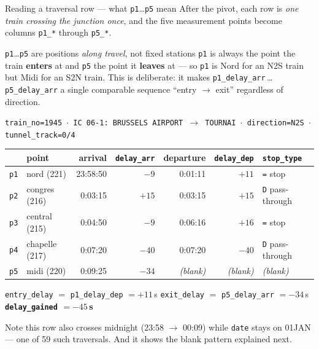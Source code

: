 \documentclass[aspectratio=169,10pt]{beamer}
\newcommand{\srcnote}[1]{{\scriptsize\color{ink3}#1}}
\newcommand{\hl}[1]{{\color{corange}\textbf{#1}}}
\begin{document}
\begin{frame}{Reading a traversal row --- what \texttt{p1}\dots\texttt{p5} mean}
  After the pivot, each row is \emph{one train crossing the junction once}, and the five
  measurement points become columns \texttt{p1\_*} through \texttt{p5\_*}.

  \vspace{0.4em}
  \begin{alertblock}{\small \texttt{p1}\dots\texttt{p5} are positions \emph{along travel}, not fixed stations}
    \small \texttt{p1} is always the point the train \textbf{enters} at and \texttt{p5} the
    point it \textbf{leaves} at --- so \texttt{p1} is Nord for an N2S train but Midi for an
    S2N train. This is deliberate: it makes
    \texttt{p1\_delay\_arr}\,\dots\,\texttt{p5\_delay\_arr} a single comparable sequence
    ``entry $\to$ exit'' regardless of direction.
  \end{alertblock}

  \vspace{0.3em}
  \centering\scriptsize
  \texttt{train\_no=1945 $\cdot$ IC 06-1: BRUSSELS AIRPORT $\to$ TOURNAI $\cdot$
  direction=N2S $\cdot$ tunnel\_track=0/4}

  \vspace{0.3em}
  \begin{tabular}{@{}llrrrrl@{}}
    \toprule
    & point & arrival & \texttt{delay\_arr} & departure & \texttt{delay\_dep} & \texttt{stop\_type} \\
    \midrule
    \texttt{p1} & nord (221) & 23:58:50 & $-9$ & 0:01:11 & $+11$ & \texttt{=} stop \\
    \texttt{p2} & congres (216) & 0:03:15 & $+15$ & 0:03:15 & $+15$ & \texttt{D} pass-through \\
    \texttt{p3} & central (215) & 0:04:50 & $-9$ & 0:06:16 & $+16$ & \texttt{=} stop \\
    \texttt{p4} & chapelle (217) & 0:07:20 & $-40$ & 0:07:20 & $-40$ & \texttt{D} pass-through \\
    \texttt{p5} & midi (220) & 0:09:25 & $-34$ & \color{corange}\textit{(blank)} & \color{corange}\textit{(blank)} & \color{corange}\textit{(blank)} \\
    \bottomrule
  \end{tabular}

  \vspace{0.5em}
  \raggedright\small
  \texttt{entry\_delay} $=$ \texttt{p1\_delay\_dep} $= +11$\,s \quad
  \texttt{exit\_delay} $=$ \texttt{p5\_delay\_arr} $= -34$\,s \quad
  \hl{\texttt{delay\_gained} $= -45$\,s}

  \srcnote{Note this row also crosses midnight (23:58 $\to$ 00:09) while \texttt{date} stays
  on 01JAN --- one of 59 such traversals. And it shows the blank pattern explained next.}
\end{frame}
\end{document}
